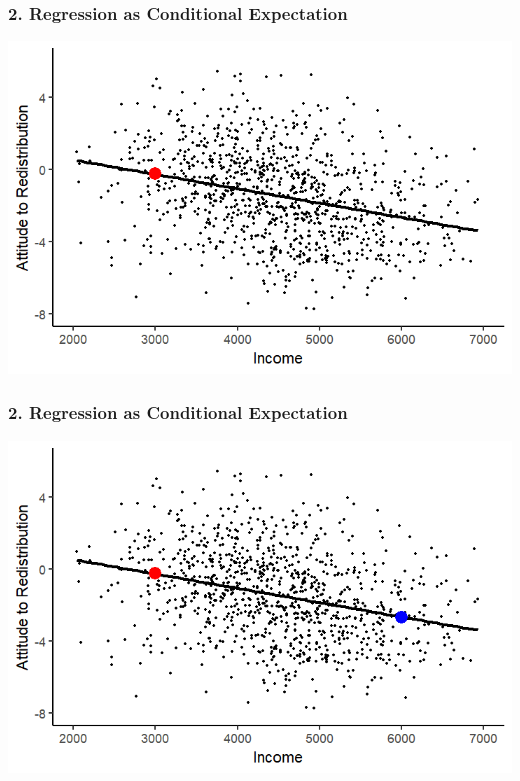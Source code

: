 \documentclass[xcolor=x11names,compress]{beamer}\usepackage[]{graphicx}\usepackage[]{color}
\makeatletter
\def\maxwidth{ %
  \ifdim\Gin@nat@width>\linewidth
    \linewidth
  \else
    \Gin@nat@width
  \fi
}
\newenvironment{knitrout}{}{} %
\renewcommand{\(}{\begin{columns}}
\renewcommand{\)}{\end{columns}}
\newcommand{\<}[1]{\begin{column}{#1}}
\renewcommand{\>}{\end{column}}
\makeatother
\begin{document}
\begin{frame}
\frametitle{2. Regression as Conditional Expectation}
\begin{knitrout}
\color{fgcolor}
\includegraphics[width=\maxwidth]{figure/cond_exp1c-1} 

\end{knitrout}
\end{frame}


\begin{frame}
\frametitle{2. Regression as Conditional Expectation}
\begin{knitrout}
\color{fgcolor}
\includegraphics[width=\maxwidth]{figure/cond_exp1-1} 

\end{knitrout}
\end{frame}
\end{document}
